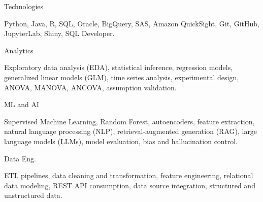 
\raggedright

\begin{cvskills}

  \cvskill
    {\begin{minipage}[t]{0.28\linewidth}\raggedright Technologies\end{minipage}}
    {\parbox[t]{0.72\linewidth}{
    Python, Java, R, SQL, Oracle, BigQuery, SAS, Amazon QuickSight, Git, GitHub, JupyterLab, Shiny, SQL Developer.
    }}

  \cvskill
    {\begin{minipage}[t]{0.28\linewidth}\raggedright Analytics\end{minipage}}
    {\parbox[t]{0.72\linewidth}{
    Exploratory data analysis (EDA), statistical inference, regression models,
    generalized linear models (GLM), time series analysis, experimental design,
    ANOVA, MANOVA, ANCOVA, assumption validation.
    }}

  \cvskill
    {\begin{minipage}[t]{0.28\linewidth}\raggedright ML and AI\end{minipage}}
    {\parbox[t]{0.72\linewidth}{
    Supervised Machine Learning, Random Forest, autoencoders, feature extraction,
    natural language processing (NLP), retrieval-augmented generation (RAG),
    large language models (LLMs), model evaluation, bias and hallucination control.
    }}

  \cvskill
    {\begin{minipage}[t]{0.28\linewidth}\raggedright Data Eng.\end{minipage}}
    {\parbox[t]{0.72\linewidth}{
    ETL pipelines, data cleaning and transformation, feature engineering,
    relational data modeling, REST API consumption, data source integration,
    structured and unstructured data.
    }}

\end{cvskills}
